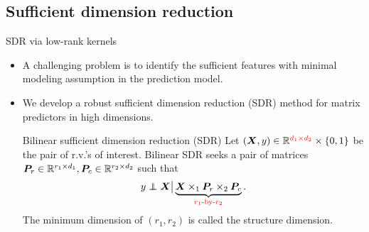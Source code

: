 \documentclass[compress,dvipsnames]{beamer}
\let\olditem\item
\renewcommand\item{\olditem\justifying}
\newcommand{\ind}{\perp\!\!\!\!\perp}
\begin{document}
\subsection{Sufficient dimension reduction}
\begin{frame}{SDR via low-rank kernels}
\begin{itemize}
\item A challenging problem is to identify the {\color{red}sufficient features} with minimal modeling assumption in the prediction model. 
\item We develop a robust sufficient dimension reduction (SDR) method for matrix predictors in high dimensions. 
\begin{block}{Bilinear sufficient dimension reduction (SDR)}
Let $(\bm{X},y)\in\mathbb{R}^{{\color{red}d_1\times d_2}}\times \{0,1\}$ be the pair of r.v.'s of interest.  Bilinear SDR seeks a pair of matrices $\bm{P}_r\in\mathbb{R}^{r_1\times d_1}, \bm{P}_c\in\mathbb{R}^{r_2\times d_2}$ such that
\[
y\ind \mX \big|\KeepStyleUnderBrace{\mX\times_1\mP_r\times_2\mP_c}_{\text{\color{red}$r_1$-by-$r_2$}}.
\]
The minimum dimension of $(r_1,r_2)$ is called the structure dimension. 
\end{block} 
\end{itemize}

\end{frame}
\end{document}
